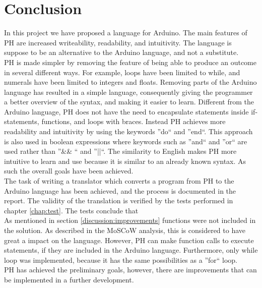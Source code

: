 \section{Conclusion}

In this project we have proposed a language for Arduino. The main features of PH are increased writeability, readability, and intuitivity. The language is suppose to be an alternative to the Arduino language, and not a substitute.\\

PH is made simpler by removing the feature of being able to produce an outcome in several different ways. For example, loops have been limited to while, and numerals have been limited to integers and floats. Removing parts of the Arduino language has resulted in a simple language, consequently giving the programmer a better overview of the syntax, and making it easier to learn. Different from the Arduino language, PH does not have the need to encapsulate statements inside if-statements, functions, and loops with braces. Instead PH achieves more readability and intuitivity by using the keywords ''do`` and ''end``. This approach is also used in boolean expressions where keywords such as ''and`` and ''or`` are used rather than ''\&\& `` and ''||``. The similarity to English makes PH more intuitive to learn and use because it is similar to an already known syntax. As such the overall goals have been achieved. \\
The task of writing a translator which converts a program from PH to the Arduino language has been achieved, and the process is documented in the report. The validity of the translation is verified by the tests performed in
chapter \ref{chap:test}. The tests conclude that  \\
As mentioned in section \ref{discussion:improvements} functions were not included in the solution. As described in the MoSCoW analysis, this is considered to have great a impact on the language. However, PH can make function calls to execute statements, if they are included in the Arduino language. Furthermore, only while loop was implemented, because it has the same possibilities as a ''for`` loop. \\

PH has achieved the preliminary goals, however, there are improvements that can be implemented in a further development.\\
